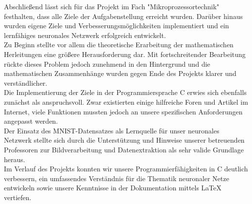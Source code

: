 \documentclass[a4paper, 12pt]{article}
\begin{document}
Abschließend lässt sich für das Projekt im Fach "Mikroprozessortechnik" festhalten, 
dass alle Ziele der Aufgabenstellung erreicht wurden. Darüber hinaus wurden eigene 
Ziele und Verbesserungsmöglichkeiten implementiert und ein lernfähiges neuronales 
Netzwerk erfolgreich entwickelt.\\
Zu Beginn stellte vor allem die theoretische Erarbeitung der mathematischen Herleitungen 
eine größere Herausforderung dar. Mit fortschreitender Bearbeitung rückte dieses 
Problem jedoch zunehmend in den Hintergrund und die mathematischen Zusammenhänge wurden 
gegen Ende des Projekts klarer und verständlicher.\\
Die Implementierung der Ziele in der Programmiersprache C erwies sich ebenfalls 
zunächst als anspruchsvoll. Zwar existierten einige hilfreiche Foren und Artikel im 
Internet, viele Funktionen mussten jedoch an unsere spezifischen Anforderungen angepasst 
werden.\\
Der Einsatz des MNIST-Datensatzes als Lernquelle für unser neuronales Netzwerk stellte 
sich durch die Unterstützung und Hinweise unserer betreuenden Professoren zur 
Bildverarbeitung und Datenextraktion als sehr valide Grundlage heraus.\\
Im Verlauf des Projekts konnten wir unsere Programmierfähigkeiten in C deutlich 
verbessern, ein umfassendes Verständnis für die Thematik neuronaler Netze entwickeln 
sowie unsere Kenntnisse in der Dokumentation mittels \LaTeX{} vertiefen.

\newpage %



\end{document}

